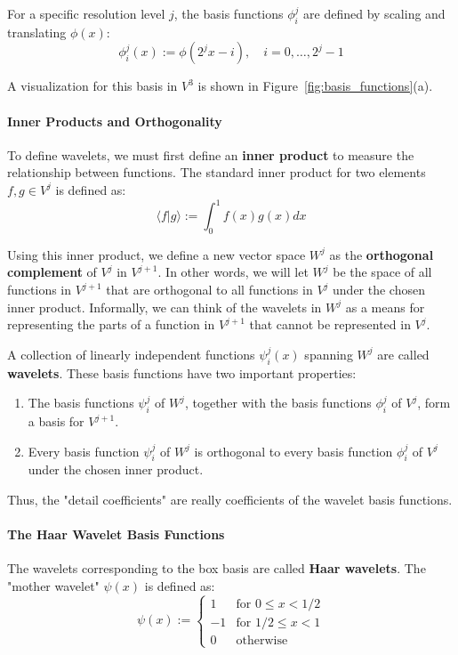 For a specific resolution level $j$, the basis functions $\phi_i^j$ are defined by scaling and translating $\phi(x)$:
$$\phi_i^j(x) := \phi(2^j x - i), \quad i = 0, \dots, 2^j - 1$$

A visualization for this basis in $V^3$ is shown in Figure~\ref{fig:basis_functions}(a).

\paragraph{Inner Products and Orthogonality}

To define wavelets, we must first define an \textbf{inner product} to measure the relationship between functions. The standard inner product for two elements $f, g \in V^j$ is defined as:
$$\langle f|g\rangle := \int_{0}^{1}f(x)g(x)dx$$

Using this inner product, we define a new vector space \textbf{$W^j$} as the \textbf{orthogonal complement} of $V^j$ in $V^{j+1}$. In other words, we will let $W^j$ be the space of all functions in $V^{j+1}$ that are orthogonal to all functions in $V^j$ under the chosen inner product. Informally, we can think of the wavelets in $W^j$ as a means for representing the parts of a function in $V^{j+1}$ that cannot be represented in $V^j$.

A collection of linearly independent functions $\psi_i^j(x)$ spanning $W^j$ are called \textbf{wavelets}. These basis functions have two important properties:
\begin{enumerate}
\item The basis functions $\psi_i^j$ of $W^j$, together with the basis functions $\phi_i^j$ of $V^j$, form a basis for $V^{j+1}$.
\item Every basis function $\psi_i^j$ of $W^j$ is orthogonal to every basis function $\phi_i^j$ of $V^j$ under the chosen inner product.
\end{enumerate}

Thus, the "detail coefficients" are really coefficients of the wavelet basis functions.

\paragraph{The Haar Wavelet Basis Functions}

The wavelets corresponding to the box basis are called \textbf{Haar wavelets}. The "mother wavelet" $\psi(x)$ is defined as:
$$\psi(x) := \begin{cases} 1 & \text{for } 0 \le x < 1/2 \\ -1 & \text{for } 1/2 \le x < 1 \\ 0 & \text{otherwise} \end{cases}$$

